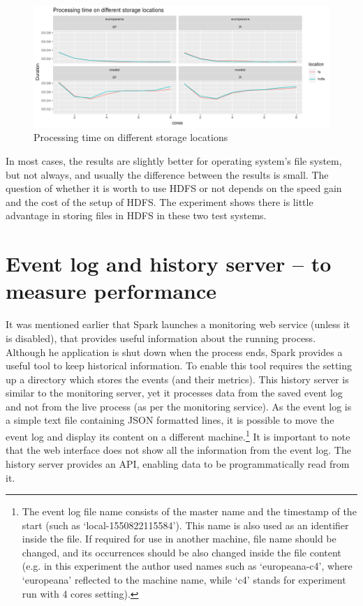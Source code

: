 \begin{figure}
\includegraphics[width=\textwidth]{images/chapter06/hdfs-vs-fs.png}
\caption{Processing time on different storage locations}
\label{figure:hdfs-vs-fs}
\end{figure}

In most cases, the results are slightly better for operating system's file system, but not always, and usually the difference between the results is small. The question of whether it is worth to use HDFS or not depends on the speed gain and the cost of the setup of HDFS. The experiment shows there is little advantage in storing files in HDFS in these two test systems.

\section{Event log and history server -- to measure performance}

It was mentioned earlier that Spark launches a monitoring web service (unless it is disabled), that provides useful information about the running process. Although he application is shut down when the process ends, Spark provides a useful tool to keep historical information. To enable this tool requires the setting up a directory which stores the events (and their metrics). This history server is similar to the monitoring server, yet it processes data from the saved event log and not from the live process (as per the monitoring service).  As the event log is a simple text file containing JSON formatted lines, it is possible to move the event log and display its content on a different machine.\footnote{The event log file name consists of the master name and the timestamp of the start (such as `local-1550822115584'). This name is also used as an identifier inside the file. If required for use in another machine, file name should be changed, and its occurrences should be also changed inside the file content (e.g. in this experiment the author used names such as `europeana-c4', where `europeana' reflected to the machine name, while `c4' stands for experiment run with 4 cores setting).} It is important to note that the web interface does not show all the information from the event log. The history server provides an API, enabling data to be programmatically read from it.

